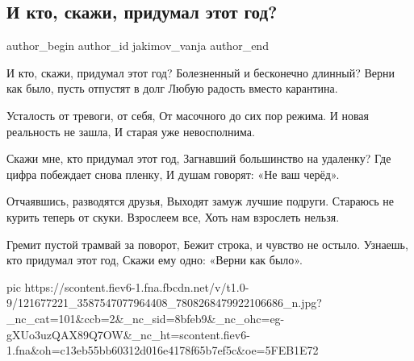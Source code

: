  
 
 
 
 
 
\subsection{И кто, скажи, придумал этот год?}
\label{sec:15_10_2020.fb.jakimov_vanja.1.kto_pridumal_etot_god}
\ifcmt
	author_begin
   author_id jakimov_vanja
	author_end
\fi

\begin{multicols}{2}
	\obeycr
И кто, скажи, придумал этот год? 
Болезненный и бесконечно длинный?
Верни как было, пусть отпустят в долг
Любую радость вместо карантина.

Усталость от тревоги, от себя,
От масочного до сих пор режима.
И новая реальность не зашла,
И старая уже невосполнима.

Скажи мне, кто придумал этот год,
Загнавший большинство на удаленку?
Где цифра побеждает снова пленку,
И душам говорят: «Не ваш черёд».

Отчаявшись, разводятся друзья,
Выходят замуж лучшие подруги.
Стараюсь не курить теперь от скуки.
Взрослеем все, 
Хоть нам взрослеть нельзя.

Гремит пустой трамвай за поворот,
Бежит строка, и чувство не остыло.
Узнаешь, кто придумал этот год, 
Скажи ему одно:
«Верни как было».
	\restorecr
\end{multicols}

\ifcmt
pic https://scontent.fiev6-1.fna.fbcdn.net/v/t1.0-9/121677221_3587547077964408_7808268479922106686_n.jpg?_nc_cat=101&ccb=2&_nc_sid=8bfeb9&_nc_ohc=eg-gXUo3uzQAX89Q7OW&_nc_ht=scontent.fiev6-1.fna&oh=c13eb55bb60312d016e4178f65b7ef5c&oe=5FEB1E72
\fi

